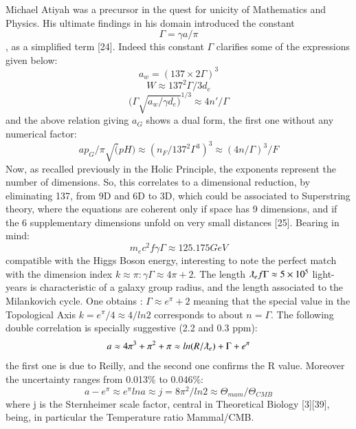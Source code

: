 \documentclass[twoside,draft]{article}
\begin{document}
{Michael Atiyah was a precursor in the quest for unicity of Mathematics and Physics. His ultimate
findings in his domain introduced the constant $$\Gamma = \gamma a/\pi$$, as a simplified term [24]. Indeed this
constant $\Gamma$ clarifies some of the expressions given below:
\begin{equation}
a_{w} = (137 \times 2 \Gamma)^{3}
\end{equation}
\begin{equation}
W \approx 137^{2} \Gamma / 3d_{e}
\end{equation}
\begin{equation}
( \Gamma\sqrt{a_{w}/\gamma d_{e})}^{1/3} \approx 4n\prime / \Gamma
\end{equation}
and the above relation giving $a_{G}$ shows a dual form, the first one without any numerical factor:
\begin{equation}
ap_{G} / \pi \sqrt(pH) \approx (n_{F}/137^{2} \Gamma^{3} )^{3} \approx (4n/ \Gamma)^{3}/F
\end{equation}
Now, as recalled previously in the Holic Principle, the exponents represent the number of
dimensions. So, this correlates to a dimensional reduction, by eliminating 137, from 9D and 6D to
3D, which could be associated to Superstring theory, where the equations are coherent only if space
has 9 dimensions, and if the 6 supplementary dimensions unfold on very small distances [25].
Bearing in mind:
\begin{equation}
m_{e} c^{2} f{\gamma\Gamma} \approx 125.175 GeV
\end{equation}
compatible with the Higgs Boson energy, interesting to note the perfect match with the dimension index $k \approx \pi: \gamma\Gamma
\approx 4\pi + 2$. The length $\lambdabar_{e} f{\Gamma} \approx 5\times 10^{5}$ light-years is characteristic of a galaxy group radius, and the length associated to the Milankovich cycle. One obtains :
$\Gamma \approx e^\pi + 2$
meaning that the special value in the Topological Axis $k = e^{\pi} /4 \approx 4/ln2$ corresponds to about $n = \Gamma$.
The following double correlation is specially suggestive (2.2 and 0.3 ppm):
\begin{equation}
a \approx 4\pi^{3} + \pi^{2} + \pi \approx ln(R/\lambdabar_{e} ) + \Gamma + e^{\pi}
\end{equation}
the first one is due to Reilly, and the second one confirms the R value. Moreover the uncertainty ranges from 0.013\% to 0.046\%:
\begin{equation}
a - e^{\pi} \approx e^{\pi} lna \approx j = 8\pi^{2} /ln2 \approx \Theta_{mam} /\Theta_{CMB}
\end{equation}
where j is the Sternheimer scale factor, central in Theoretical Biology [3][39], being, in particular the
Temperature ratio Mammal/CMB.

}
\end{document}
